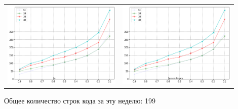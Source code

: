 \documentclass{article}
\begin{document}
\begin{enumerate}
\begin{table}[h!]
\begin{tabular}{p{0.45\linewidth}p{0.45\linewidth}}
            \includegraphics[width=\linewidth]{fp1} & \includegraphics[width=\linewidth]{fp1_non_binary}\\ 
        \end{tabular}
    \end{table}
\end{enumerate}

Общее количество строк кода за эту неделю: 199\\
\end{document}
